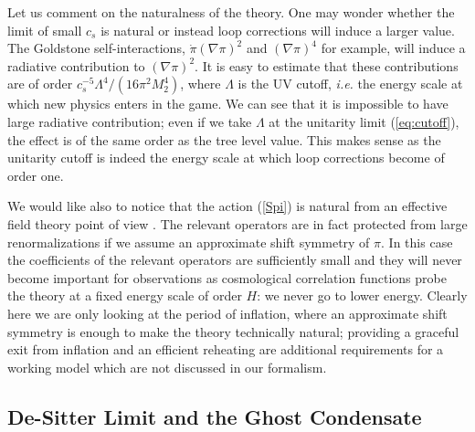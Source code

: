 \documentclass[12pt,letterpaper]{article}
\begin{document}
{Let us comment on the naturalness of the theory. One may wonder
whether the limit of small $c_s$ is natural or instead loop
corrections will induce a larger value. The Goldstone
self-interactions, $\dot\pi(\nabla\pi)^2$ and $(\nabla\pi)^4$ for
example, will
induce a radiative contribution to $(\nabla\pi)^2$. It is easy to
estimate that these contributions are of order $c_s^{-5}
\Lambda^4/(16 \pi^2 M_2^4)$, where $\Lambda$ is the UV cutoff, {\em i.e.} the
energy scale at which new physics enters in the game. We can see that
it is impossible to have large radiative contribution; even if we take
$\Lambda$ at the unitarity limit (\ref{eq:cutoff}), the effect is of
the same order as the tree level value. This makes sense as
the unitarity cutoff is indeed the energy scale at which loop
corrections become of order one.



 We would like also to notice that the action (\ref{Spi}) is
natural from an effective field theory point of view
\cite{Polchinski:1992ed}. The relevant operators are in fact protected
from large renormalizations if we assume an approximate shift symmetry
of $\pi$. In this case the coefficients of the relevant operators are sufficiently
small and they will never become important for observations as cosmological correlation functions
probe the theory at a fixed energy scale of order $H$: we never go
to lower energy. Clearly here we are only looking at the period of
inflation, where an approximate shift symmetry is enough to make the
theory technically natural; providing a graceful exit from inflation
and an efficient reheating are additional requirements for a working
model which are not discussed in our formalism.



\subsection{De-Sitter Limit and the Ghost Condensate}



}
\end{document}
